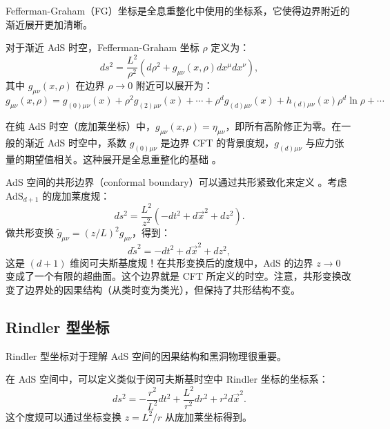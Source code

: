 Fefferman-Graham（FG）坐标是全息重整化中使用的坐标系，它使得边界附近的渐近展开更加清晰。

\begin{definition}
对于渐近 AdS 时空，Fefferman-Graham 坐标 $\rho$ 定义为：
\begin{equation}
    ds^2 = \frac{L^2}{\rho^2} \left( d\rho^2 + g_{\mu\nu}(x, \rho) dx^\mu dx^\nu \right),
\end{equation}
其中 $g_{\mu\nu}(x, \rho)$ 在边界 $\rho \to 0$ 附近可以展开为：
\begin{equation}
    g_{\mu\nu}(x, \rho) = g_{(0)\mu\nu}(x) + \rho^2 g_{(2)\mu\nu}(x) + \cdots + \rho^d g_{(d)\mu\nu}(x) + h_{(d)\mu\nu}(x) \rho^d \ln \rho + \cdots
\end{equation}
\end{definition}

\begin{remark}
在纯 AdS 时空（庞加莱坐标）中，$g_{\mu\nu}(x, \rho) = \eta_{\mu\nu}$，即所有高阶修正为零。在一般的渐近 AdS 时空中，系数 $g_{(0)\mu\nu}$ 是边界 CFT 的背景度规，$g_{(d)\mu\nu}$ 与应力张量的期望值相关。这种展开是全息重整化的基础 \cite{deHaro2000, Balasubramanian1999}。
\end{remark}

\begin{remark}
AdS 空间的共形边界（conformal boundary）可以通过共形紧致化来定义 \cite{Aharony1999}。考虑 AdS$_{d+1}$ 的庞加莱度规：
\begin{equation}
    ds^2 = \frac{L^2}{z^2}\left(-dt^2 + d\vec{x}^2 + dz^2\right).
\end{equation}
做共形变换 $\tilde{g}_{\mu\nu} = (z/L)^2 g_{\mu\nu}$，得到：
\begin{equation}
    d\tilde{s}^2 = -dt^2 + d\vec{x}^2 + dz^2,
\end{equation}
这是 $(d+1)$ 维闵可夫斯基度规！在共形变换后的度规中，AdS 的边界 $z \to 0$ 变成了一个有限的超曲面。这个边界就是 CFT 所定义的时空。注意，共形变换改变了边界处的因果结构（从类时变为类光），但保持了共形结构不变。
\end{remark}

\subsection{Rindler 型坐标}

Rindler 型坐标对于理解 AdS 空间的因果结构和黑洞物理很重要。

\begin{definition}
在 AdS 空间中，可以定义类似于闵可夫斯基时空中 Rindler 坐标的坐标系：
\begin{equation}
    ds^2 = -\frac{r^2}{L^2} dt^2 + \frac{L^2}{r^2} dr^2 + r^2 d\vec{x}^2.
\end{equation}
这个度规可以通过坐标变换 $z = L^2/r$ 从庞加莱坐标得到。
\end{definition}

